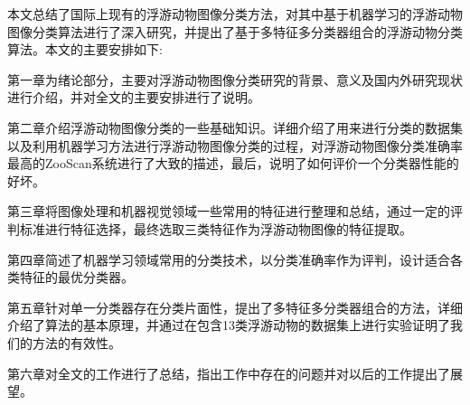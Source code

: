 本文总结了国际上现有的浮游动物图像分类方法，对其中基于机器学习的浮游动物图像分类算法进行了深入研究，并提出了基于多特征多分类器组合的浮游动物分类算法。本文的主要安排如下:

第一章为绪论部分，主要对浮游动物图像分类研究的背景、意义及国内外研究现状进行介绍，并对全文的主要安排进行了说明。

第二章介绍浮游动物图像分类的一些基础知识。详细介绍了用来进行分类的数据集以及利用机器学习方法进行浮游动物图像分类的过程，对浮游动物图像分类准确率最高的ZooScan系统进行了大致的描述，最后，说明了如何评价一个分类器性能的好坏。

第三章将图像处理和机器视觉领域一些常用的特征进行整理和总结，通过一定的评判标准进行特征选择，最终选取三类特征作为浮游动物图像的特征提取。

第四章简述了机器学习领域常用的分类技术，以分类准确率作为评判，设计适合各类特征的最优分类器。

第五章针对单一分类器存在分类片面性，提出了多特征多分类器组合的方法，详细介绍了算法的基本原理，并通过在包含13类浮游动物的数据集上进行实验证明了我们的方法的有效性。

第六章对全文的工作进行了总结，指出工作中存在的问题并对以后的工作提出了展望。